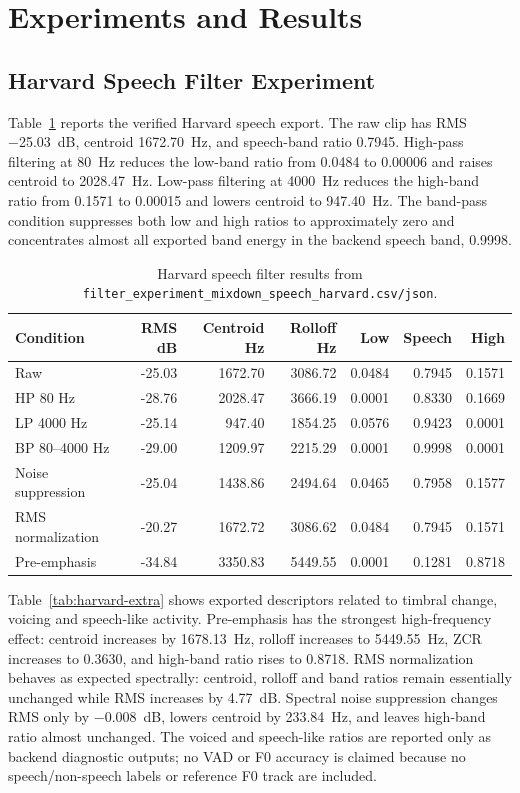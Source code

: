 \documentclass[11pt,a4paper]{article}
\begin{document}
\section{Experiments and Results}

\subsection{Harvard Speech Filter Experiment}

Table~\ref{tab:harvard-main} reports the verified Harvard speech export. The raw clip has RMS \SI{-25.03}{dB}, centroid \SI{1672.70}{Hz}, and speech-band ratio 0.7945. High-pass filtering at \SI{80}{Hz} reduces the low-band ratio from 0.0484 to 0.00006 and raises centroid to \SI{2028.47}{Hz}. Low-pass filtering at \SI{4000}{Hz} reduces the high-band ratio from 0.1571 to 0.00015 and lowers centroid to \SI{947.40}{Hz}. The band-pass condition suppresses both low and high ratios to approximately zero and concentrates almost all exported band energy in the backend speech band, 0.9998.

\begin{table}[h]
\centering
\caption{Harvard speech filter results from \texttt{filter\_experiment\_mixdown\_speech\_harvard.csv/json}.}
\label{tab:harvard-main}
\small
\begin{tabular}{lrrrrrr}
\toprule
Condition & RMS dB & Centroid Hz & Rolloff Hz & Low & Speech & High \\
\midrule
Raw & -25.03 & 1672.70 & 3086.72 & 0.0484 & 0.7945 & 0.1571 \\
HP 80 Hz & -28.76 & 2028.47 & 3666.19 & 0.0001 & 0.8330 & 0.1669 \\
LP 4000 Hz & -25.14 & 947.40 & 1854.25 & 0.0576 & 0.9423 & 0.0001 \\
BP 80--4000 Hz & -29.00 & 1209.97 & 2215.29 & 0.0001 & 0.9998 & 0.0001 \\
Noise suppression & -25.04 & 1438.86 & 2494.64 & 0.0465 & 0.7958 & 0.1577 \\
RMS normalization & -20.27 & 1672.72 & 3086.62 & 0.0484 & 0.7945 & 0.1571 \\
Pre-emphasis & -34.84 & 3350.83 & 5449.55 & 0.0001 & 0.1281 & 0.8718 \\
\bottomrule
\end{tabular}
\end{table}

Table~\ref{tab:harvard-extra} shows exported descriptors related to timbral change, voicing and speech-like activity. Pre-emphasis has the strongest high-frequency effect: centroid increases by \SI{1678.13}{Hz}, rolloff increases to \SI{5449.55}{Hz}, ZCR increases to 0.3630, and high-band ratio rises to 0.8718. RMS normalization behaves as expected spectrally: centroid, rolloff and band ratios remain essentially unchanged while RMS increases by \SI{4.77}{dB}. Spectral noise suppression changes RMS only by \SI{-0.008}{dB}, lowers centroid by \SI{233.84}{Hz}, and leaves high-band ratio almost unchanged. The voiced and speech-like ratios are reported only as backend diagnostic outputs; no VAD or F0 accuracy is claimed because no speech/non-speech labels or reference F0 track are included.
\end{document}
